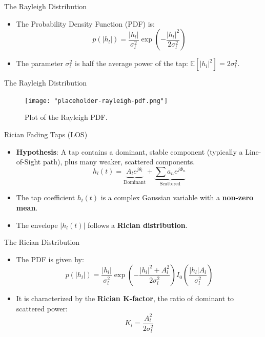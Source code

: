 \documentclass{beamer}
\begin{document}
	\begin{frame}{The Rayleigh Distribution}
		\begin{itemize}
			\item The Probability Density Function (PDF) is:
			\[ p(|h_l|) = \frac{|h_l|}{\sigma_l^2} \exp\left(-\frac{|h_l|^2}{2\sigma_l^2}\right) \]
			
			\item The parameter $\sigma_l^2$ is half the average power of the tap: $\mathbb{E}[|h_l|^2] = 2\sigma_l^2$.
		\end{itemize}
	\end{frame}
	
	\begin{frame}{The Rayleigh Distribution}
		\begin{figure}
			\centering
			\texttt{[image: "placeholder-rayleigh-pdf.png"]}
			\caption{Plot of the Rayleigh PDF.}
		\end{figure}
	\end{frame}
	
	\begin{frame}{Rician Fading Taps (LOS)}
		\begin{itemize}
			\item \textbf{Hypothesis}: A tap contains a dominant, stable component (typically a Line-of-Sight path), plus many weaker, scattered components.
			\[ h_l(t) = \underbrace{A_l e^{j\theta_l}}_{\text{Dominant}} + \underbrace{\sum a_n e^{j\Phi_n}}_{\text{Scattered}} \]
			
			\item The tap coefficient $h_l(t)$ is a complex Gaussian variable with a \textbf{non-zero mean}.
			
			\item The envelope $|h_l(t)|$ follows a \textbf{Rician distribution}.
		\end{itemize}
	\end{frame}
	
	\begin{frame}{The Rician Distribution}
		\begin{itemize}
			\item The PDF is given by:
			\[ p(|h_l|) = \frac{|h_l|}{\sigma_l^2} \exp\left(-\frac{|h_l|^2 + A_l^2}{2\sigma_l^2}\right) I_0\left(\frac{|h_l|A_l}{\sigma_l^2}\right) \]
			
			\item It is characterized by the \textbf{Rician K-factor}, the ratio of dominant to scattered power:
			\[ K_l = \frac{A_l^2}{2\sigma_l^2} \]
		\end{itemize}
	\end{frame}
	
\end{document}
